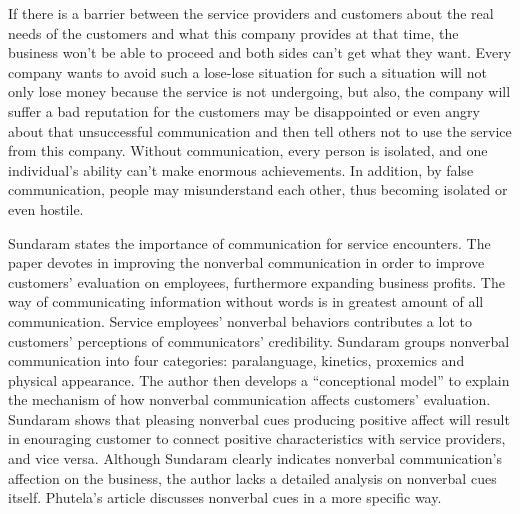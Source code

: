 \documentclass[12pt]{article}
\begin{document}
\begin{flushleft}
If there is a barrier between the service providers and customers about the real
needs of the customers and what this company provides at that time, the
business won't be able to proceed and both sides can't get what they want. Every
company wants to avoid such a lose-lose situation for such a situation will not
only lose money because the service is not undergoing, but also, the company
will suffer a bad reputation for the customers may be disappointed or even angry
about that unsuccessful communication and then tell others not to use the
service from this company.
Without communication, every person is isolated, and one individual's ability
can't make enormous achievements. In addition, by false communication, people
may misunderstand each other, thus becoming isolated or even hostile.


Sundaram states the importance of communication for service encounters.
The paper devotes in improving the nonverbal communication in order to improve
customers' evaluation on employees, furthermore expanding business profits. 
The way of communicating information without words is in greatest amount of all
communication. Service employees' nonverbal behaviors contributes a lot to
customers' perceptions of communicators' credibility. Sundaram groups nonverbal
communication into four categories: paralanguage, kinetics, proxemics and
physical appearance. The author then develops a ``conceptional model'' to
explain the mechanism of how nonverbal communication affects customers'
evaluation. Sundaram shows that pleasing nonverbal cues producing positive
affect will result in enouraging customer to connect positive characteristics
with service providers, and vice versa. Although Sundaram clearly indicates 
nonverbal communication's affection on the business, the author lacks a detailed
analysis on nonverbal cues itself. Phutela's article discusses nonverbal cues in
a more specific way.


\end{flushleft}
\end{document}
